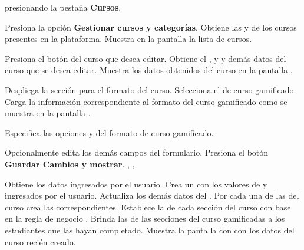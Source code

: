 \begin{UCtrayectoria}%
%
  presionando la pestaña {\bf Cursos}.

  \Actor Presiona la opción {\bf Gestionar cursos y categorías}.
  \Sistema Obtiene las  y
            de los cursos presentes en la plataforma.
  \Sistema Muestra en la pantalla  la lista de cursos.
           \label{CU-E05-course-list}

  \Actor Presiona el botón \IUConfigurar del curso que desea editar.
  \Sistema Obtiene el ,  y
            y demás datos del curso que se desea editar.
  \Sistema Muestra los datos obtenidos del curso en la pantalla .


  \Actor Despliega la sección para el formato del curso.
  \Actor Selecciona el  de curso gamificado.
  \Sistema Carga la información correspondiente al formato del curso gamificado
           como se muestra en la pantalla .

  \Actor Especifica las opciones  y
          del formato de curso gamificado. 

  \Actor Opcionalmente edita los demás campos del formulario.
  \Actor Presiona el botón {\bf Guardar Cambios y mostrar}. , ,
          \label{CU-E05-submit}

  \Sistema Obtiene los datos ingresados por el usuario.
  \Sistema Crea un  con los valores de  
           y  ingresados por el usuario.
  \Sistema Actualiza los demás datos del .
  \Sistema Por cada una de las  del curso crea las
            correspondientes.
  \Sistema Establece la  de cada sección del curso con base
           en la regla de negocio .
  \Sistema Brinda las  de las secciones del curso
           gamificadas a los estudiantes que las hayan completado. \label{CU-E05-finish}
  \Sistema Muestra la pantalla con  con los datos del curso recién
           creado.

\end{UCtrayectoria}

